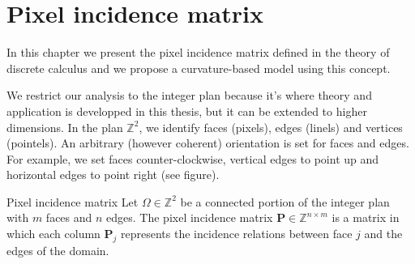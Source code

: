 \chapter{Pixel incidence matrix}
\label{app2:pixel-incidence-matrix}

In this chapter we present the pixel incidence matrix defined in the theory of discrete calculus and we propose a curvature-based model using this concept.

We restrict our analysis to the integer plan because it's where theory and application is developped in this thesis, but it can be extended to higher dimensions. In the plan $\mathbb{Z}^2$, we identify faces (pixels), edges (linels) and vertices (pointels). An arbitrary (however coherent) orientation is set for faces and edges. For example, we set faces counter-clockwise, vertical edges to point up and horizontal edges to point right (see figure).

\begin{definition}{Pixel incidence matrix}
	Let $\Omega \in \mathbb{Z}^2$ be a connected portion of the integer plan with $m$ faces and $n$ edges. The pixel incidence matrix $\mathbf{P} \in \mathbb{Z}^{n \times m}$ is a matrix in which each column $\mathbf{P} _j$ represents the incidence relations between face $j$ and the edges of the domain.
\end{definition}

